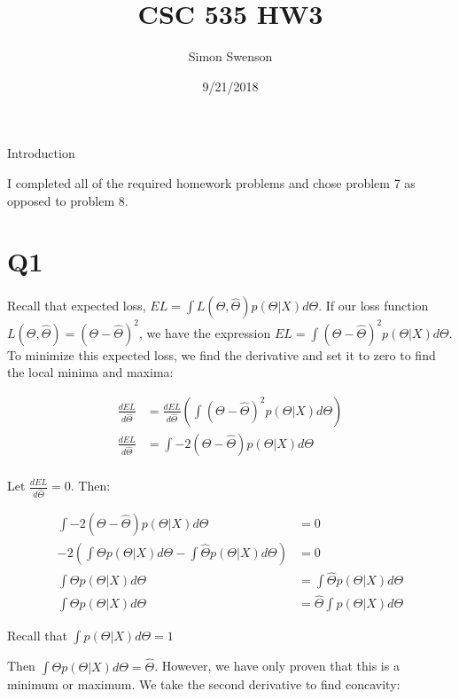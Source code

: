 \documentclass{article}
\title{CSC 535 HW3}
\date{9/21/2018}
\author{Simon Swenson}
\begin{document}
\maketitle
{}

\large Introduction

\small I completed all of the required homework problems and chose problem 7 as 
opposed to problem 8.

\section{Q1}

Recall that expected loss, $ EL = \int L(\Theta, \hat{\Theta}) p(\Theta | X) d 
\Theta $. If our loss function $ L(\Theta, \hat{\Theta}) = (\Theta - \hat{\Theta})^2 $,
we have the expression $ EL = \int (\Theta - \hat{\Theta})^2 p(\Theta | X) d \Theta$.
To minimize this expected loss, we find the derivative and set it to zero to 
find the local minima and maxima:

\begin{align*}
\frac{d EL}{d \hat{\Theta}} &= \frac{d EL}{d \hat{\Theta}} (\int (\Theta - \hat{\Theta})^2 p(\Theta | X) d \Theta) \\
\frac{d EL}{d \hat{\Theta}} &= \int -2 (\Theta - \hat{\Theta}) p(\Theta | X) d \Theta \\
\end{align*}

Let $ \frac{d EL}{d \hat{\Theta}} = 0 $. Then:

\begin{align*}
\int -2 (\Theta - \hat{\Theta}) p(\Theta | X) d \Theta                             &= 0 \\
-2 (\int \Theta p(\Theta | X) d \Theta - \int \hat{\Theta} p(\Theta | X) d \Theta) &= 0 \\
\int \Theta p(\Theta | X) d \Theta                                                 &= \int \hat{\Theta} p(\Theta | X) d \Theta \\
\int \Theta p(\Theta | X) d \Theta                                                 &= \hat{\Theta} \int p(\Theta | X) d \Theta
\end{align*}

Recall that $ \int p(\Theta | X) d \Theta = 1 $

Then $ \int \Theta p(\Theta | X) d \Theta = \hat{\Theta} $. However, we have 
only proven that this is a minimum or maximum. We take the second derivative to 
find concavity:
\end{document}

